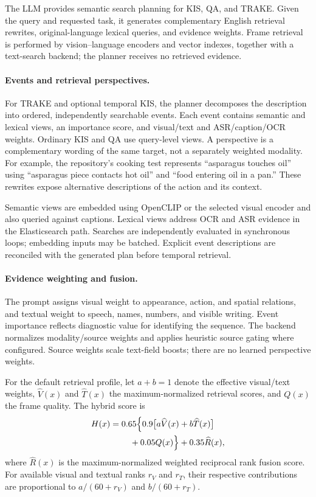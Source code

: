 \documentclass[11pt]{article}
\begin{document}
The LLM provides semantic search planning for KIS, QA, and TRAKE.
Given the query and requested task, it generates complementary
English retrieval rewrites, original-language lexical queries, and
evidence weights. Frame retrieval is performed by vision--language
encoders and vector indexes, together with a text-search backend;
the planner receives no retrieved evidence.

\paragraph{Events and retrieval perspectives.}
For TRAKE and optional temporal KIS, the planner decomposes the
description into ordered, independently searchable events. Each event
contains semantic and lexical views, an importance score, and
visual/text and ASR/caption/OCR weights. Ordinary KIS and QA use
query-level views. A perspective is a complementary wording of the
same target, not a separately weighted modality. For example, the
repository's cooking test represents ``asparagus touches oil'' using
``asparagus piece contacts hot oil'' and ``food entering oil in a
pan.'' These rewrites expose alternative descriptions of the action
and its context.

Semantic views are embedded using OpenCLIP or the selected visual
encoder and also queried against captions. Lexical views address
OCR and ASR evidence in the Elasticsearch path. Searches are
independently evaluated in synchronous loops; embedding inputs may
be batched. Explicit event descriptions are reconciled with the
generated plan before temporal retrieval.

\paragraph{Evidence weighting and fusion.}
The prompt assigns visual weight to appearance, action, and spatial
relations, and textual weight to speech, names, numbers, and visible
writing. Event importance reflects diagnostic value for identifying
the sequence. The backend normalizes modality/source weights and
applies heuristic source gating where configured. Source weights
scale text-field boosts; there are no learned perspective weights.

For the default retrieval profile, let $a+b=1$ denote the effective
visual/text weights, $\widehat{V}(x)$ and $\widehat{T}(x)$ the
maximum-normalized retrieval scores, and $Q(x)$ the frame quality.
The hybrid score is
\begin{equation}
\begin{aligned}
H(x) ={}&
0.65 \Bigl\{
0.9 \bigl[
a\widehat{V}(x)
+ b\widehat{T}(x)
\bigr] \\
&\quad + 0.05 Q(x)
\Bigr\}
+ 0.35\widehat{R}(x),
\end{aligned}
\label{eq:hybrid_score}
\end{equation}
where $\widehat{R}(x)$ is the maximum-normalized weighted reciprocal
rank fusion score. For available visual and textual ranks $r_V$ and
$r_T$, their respective contributions are proportional to
$a/(60+r_V)$ and $b/(60+r_T)$.
\end{document}
